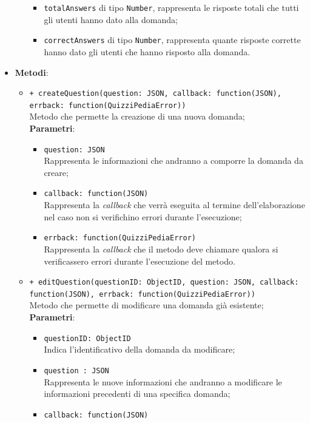 \begin{itemize}
\begin{itemize}
\begin{itemize}
			\item \texttt{totalAnswers} di tipo \texttt{Number}, rappresenta le risposte totali che tutti gli utenti hanno dato alla domanda;
			\item \texttt{correctAnswers} di tipo \texttt{Number}, rappresenta quante risposte corrette hanno dato gli utenti che hanno risposto alla domanda.
		\end{itemize}
	\end{itemize}
\item \textbf{Metodi}:
	\begin{itemize}
	\item \texttt{+ createQuestion(question: JSON, callback: function(JSON), errback: function(QuizziPediaError))} \\
	Metodo che permette la creazione di una nuova domanda; \\
		\textbf{Parametri}:
		\begin{itemize}
			\item \texttt{question: JSON} \\
			Rappresenta le informazioni che andranno a comporre la domanda da creare;
			\item \texttt{callback: function(JSON)} \\
			Rappresenta la \textit{callback} che verrà eseguita al termine dell'elaborazione nel caso non si verifichino errori durante l'esecuzione;
			\item \texttt{errback: function(QuizziPediaError)} \\
			Rappresenta la \textit{callback} che il metodo deve chiamare qualora si verificassero errori durante l'esecuzione del metodo.
		\end{itemize}   
	\item \texttt{+ editQuestion(questionID: ObjectID, question: JSON, callback: function(JSON), errback: function(QuizziPediaError))} \\
	Metodo che permette di modificare una domanda già esistente; \\
		\textbf{Parametri}:
		\begin{itemize}
			\item \texttt{questionID: ObjectID} \\
			Indica l'identificativo della domanda da modificare;
			\item \texttt{question : JSON} \\
			Rappresenta le nuove informazioni che andranno a modificare le informazioni precedenti di una specifica domanda;
			\item \texttt{callback: function(JSON)} \\

\end{itemize}
\end{itemize}
\end{itemize}
